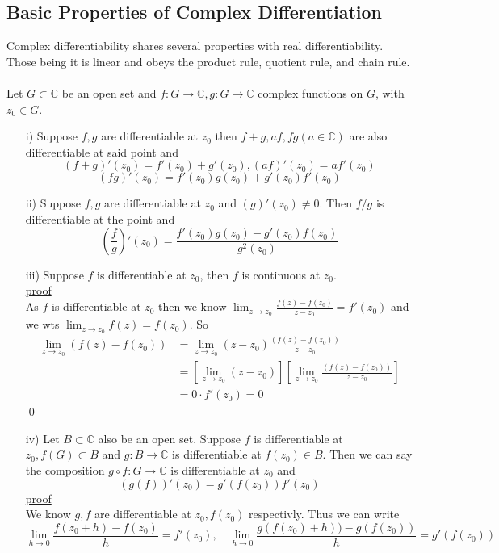\documentclass[a4paper, 12pt, twoside]{article}
\begin{document}
\subsection{Basic Properties of Complex Differentiation}
Complex differentiability shares several properties with real differentiability. Those being it is linear and obeys the product rule, quotient rule, and chain rule.\\\\
Let $G\subset \mathbb{C}$ be an open set and $f:G \to  \mathbb{C}, g:G \to  \mathbb{C}$ complex functions on $G$, with $z_{0}\in G$.
\begin{itemize}
\item[i)]  Suppose $f,g$ are differentiable at $z_{0}$ then  $f+g,af,fg (a\in \mathbb{C})$ are also differentiable at said point and
\noindent
$$(f+g)'(z_{0})=f'(z_{0})+g'(z_{0}), (af)'(z_{0})=af'(z_{0}) $$
$$(fg)'(z_{0})= f'(z_{0})g(z_{0})+g'(z_{0})f'(z_{0}) $$
\item[ii)]  Suppose $f,g$ are differentiable at $z_{0}$ and $(g)'(z_{0})\neq 0$. Then $f/g$ is differentiable at the point and
$$(\frac{f}{g})'(z_{0})=\frac{f'(z_{0})g(z_{0})-g'(z_{0})f(z_{0})}{g^{2}(z_{0})} $$
\item[iii)] Suppose $f$ is differentiable at $z_{0}$, then $f$ is continuous at $z_{0}$.\\
\underline{proof}\\
As $f$ is differentiable at $z_{0}$ then we know $\lim_{z\to z_{0}}\frac{f(z)-f(z_{0})}{z-z_{0}}=f'(z_{0}) $ and we wts $ \lim_{z\to z_{0}}f(z)=f(z_{0})$. So
\begin{align*}
     \lim_{z\to z_{0}}(f(z)-f(z_{0})) &=  \lim_{z\to z_{0}}(z-z_{0})\frac{(f(z)-f(z_{0}))}{z-z_{0}}\\
     &=[\lim_{z\to z_{0}}(z-z_{0})][\lim_{z\to z_{0}}\frac{(f(z)-f(z_{0}))}{z-z_{0}}]\\
     &= 0\cdot f'(z_{0}) =0
\end{align*}\qed\newpage
\item[iv)] Let $B\subset \mathbb{C}$ also be an open set. Suppose $f$ is differentiable at $z_{0},f(G)\subset B$ and $g:B\to \mathbb{C}$ is differentiable at $f(z_{0})\in B$. Then we can say the composition $g\circ f:G\to \mathbb{C}$ is differentiable at $z_{0}$ and
$$(g(f))'(z_{0})=g'(f(z_{0}))f'(z_{0}) $$
\underline{proof}\\
We know $g,f$ are differentiable at $z_{0}, f(z_{0})$ respectivly. Thus we can write
$$\lim_{h\to0}\frac{f(z_{0}+h)-f(z_{0})}{h}=f'(z_{0}),\quad \lim_{h\to0}\frac{g(f(z_{0})+h))-g(f(z_{0}))}{h} =g'(f(z_{0}))$$

\end{itemize}
\end{document}
